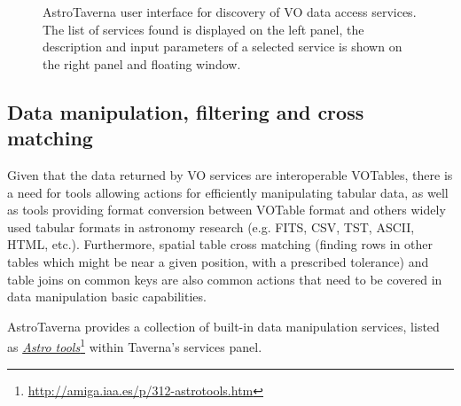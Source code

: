 \documentclass[final,authoryear,5p,times,twocolumn]{elsarticle}
\newcommand{\urlsamefont}[1]{\urlstyle{same}\url{#1}}
\newcommand{\hrefnote}[2]{\href{#1}{#2}\footnote{\urlsamefont{#1}}}
\begin{document}
\begin{figure}[tb]
\centering 
{}
\caption{AstroTaverna user interface for discovery of VO data access services. The list of services found is displayed on the left panel, the description and input parameters of a selected service is shown on the right panel and floating window.}
\label{fig:VODiscovery}
\end{figure}

\subsection{Data manipulation, filtering and cross matching}
\label{DataManipulation}

Given that the data returned by VO services are interoperable VOTables, there is a need for tools allowing actions for efficiently manipulating tabular data, as well as tools providing format conversion between VOTable format and others widely used tabular formats in astronomy research (e.g. FITS, CSV, TST, ASCII, HTML, etc.). Furthermore, spatial table cross matching (finding rows in other tables which might be near a given position, with a prescribed tolerance) and table joins on common keys are also common actions that need to be covered in data manipulation basic capabilities.

AstroTaverna provides a collection of built-in data manipulation services, listed as \hrefnote{http://amiga.iaa.es/p/312-astrotools.htm}{\label{astrotools}\textit{Astro tools}} within Taverna's services panel.
\end{document}
